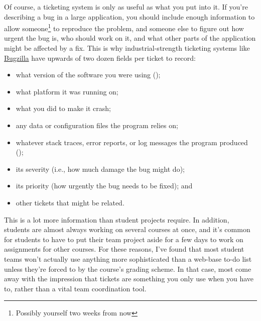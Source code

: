 \documentclass{report}
\begin{document}
Of course, a ticketing system is only as useful as what you put into
it.  If you're describing a bug in a large application, you should
include enough information to allow someone\footnote{Possibly yourself
two weeks from now} to reproduce the problem, and someone else to
figure out how urgent the bug is, who should work on it, and what
other parts of the application might be affected by a fix.  This is
why industrial-strength ticketing systems like \url{Bugzilla} have
upwards of two dozen fields per ticket to record:

\begin{itemize}

  \item what version of the software you were using
  ();

  \item what platform it was running on;

  \item what you did to make it crash;

  \item any data or configuration files the program relies on;

  \item whatever stack traces, error reports, or log messages the
  program produced ();

  \item its severity (i.e., how much damage the bug might do);

  \item its priority (how urgently the bug needs to be fixed); and

  \item other tickets that might be related.

\end{itemize}

This is a lot more information than student projects require.  In
addition, students are almost always working on several courses at
once, and it's common for students to have to put their team project
aside for a few days to work on assignments for other courses.  For
these reasons, I've found that most student teams won't actually use
anything more sophisticated than a web-base to-do list unless they're
forced to by the course's grading scheme.  In that case, most come
away with the impression that tickets are something you only use when
you have to, rather than a vital team coordination tool.

\end{document}

